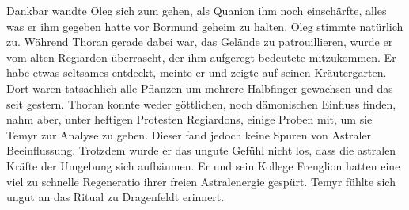 \documentclass[11pt]{scrreprt}
\begin{document}
Dankbar wandte Oleg sich zum gehen, als Quanion ihm noch einschärfte, alles was er ihm gegeben hatte vor Bormund geheim zu halten. Oleg stimmte natürlich zu. Während Thoran gerade dabei war, das Gelände zu patrouillieren, wurde er vom alten Regiardon überrascht, der ihm aufgeregt bedeutete mitzukommen. Er habe etwas seltsames entdeckt, meinte er und zeigte auf seinen Kräutergarten. Dort waren tatsächlich alle Pflanzen um mehrere Halbfinger gewachsen und das seit gestern. Thoran konnte weder göttlichen, noch dämonischen Einfluss finden, nahm aber, unter heftigen Protesten Regiardons, einige Proben mit, um sie Temyr zur Analyse zu geben. Dieser fand jedoch keine Spuren von Astraler Beeinflussung. Trotzdem wurde er das ungute Gefühl nicht los, dass die astralen Kräfte der Umgebung sich aufbäumen. Er und sein Kollege Frenglion hatten eine viel zu schnelle Regeneratio ihrer freien Astralenergie gespürt. Temyr fühlte sich ungut an das Ritual zu Dragenfeldt erinnert.\par
\end{document}
